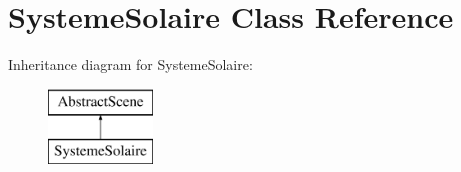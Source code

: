 \hypertarget{classSystemeSolaire}{}\section{Systeme\+Solaire Class Reference}
\label{classSystemeSolaire}
Inheritance diagram for Systeme\+Solaire\+:\begin{figure}[H]
\begin{center}
\leavevmode
\includegraphics[height=2.000000cm]{classSystemeSolaire}
\end{center}
\end{figure}
